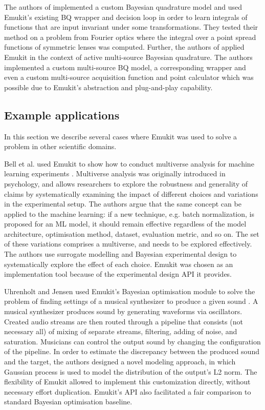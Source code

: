 The authors of \cite{Naslidnyk21} implemented a custom Bayesian quadrature model and used Emukit's existing BQ wrapper and decision loop in order to learn integrals of functions that are input invariant under some transformations. They tested their method on a problem from Fourier optics where the integral over a point spread functions of symmetric lenses was computed. Further, the authors of \cite{Gessner20} applied Emukit in the context of active multi-source Bayesian quadrature. The authors implemented a custom multi-source BQ model, a corresponding wrapper and even a custom multi-source acquisition function and point calculator which was possible due to Emukit's abstraction and plug-and-play capability.

\subsection{Example applications}
In this section we describe several cases where Emukit was used to solve a problem in other scientific domains.

Bell et al. used Emukit to show how to conduct multiverse analysis for machine learning experiments \cite{bell2022modeling}. Multiverse analysis was originally introduced in psychology, and allows researchers to explore the robustness and generality of claims by systematically examining the impact of different choices and variations in the experimental setup. The authors argue that the same concept can be applied to the machine learning: if a new technique, e.g. batch normalization, is proposed for an ML model, it should remain effective regardless of the model architecture, optimisation method, dataset, evaluation metric, and so on. The set of these variations comprises a multiverse, and needs to be explored effectively. The authors use surrogate modelling and Bayesian experimental design to systematically explore the effect of each choice. Emukit was chosen as an implementation tool because of the experimental design API it provides.

Uhrenholt and Jensen used Emukit's Bayesian optimisation module to solve the problem of finding settings of a musical synthesizer to produce a given sound \cite{uhrenholt2019efficient}. A musical synthesizer produces sound by generating waveforms via oscillators. Created audio streams are then routed through a pipeline that consists (not necessary all) of mixing of separate streams, filtering, adding of noise, and saturation. Musicians can control the output sound by changing the configuration of the pipeline. In order to estimate the discrepancy between the produced sound and the target, the authors designed a novel modeling approach, in which Gaussian process is used to model the distribution of the output's L2 norm. The flexibility of Emukit allowed to implement this customization directly, without necessary effort duplication. Emukit's API also facilitated a fair comparison to standard Bayesian optimisation baseline.

